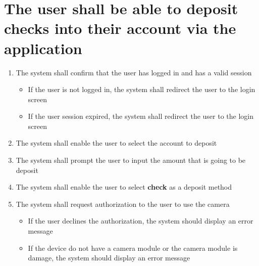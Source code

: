 \section{The user shall be able to deposit checks into their account via 
the application}
\begin{enumerate}
    \item The system shall confirm that the user has logged in and has a valid 
    session
    \begin{itemize}
        \item If the user is not logged in, the system shall redirect the user 
        to the login screen
	    \item If the user session expired, the system shall redirect the user 
        to the login screen
    \end{itemize}
    
    \item The system shall enable the user to select the account to deposit
    \item The system shall prompt the user to input the amount that is going to 
    be deposit
    \item The system shall enable the user to select \textbf{check} as a 
    deposit method
    
    \item The system shall request authorization to the user to use the camera
    \begin{itemize}
        \item If the user declines the authorization, the system should display 
        an error message 
        \item If the device do not have a camera module or the camera module is 
        damage, the system should display an error message
    \end{itemize}
        

\end{enumerate}
